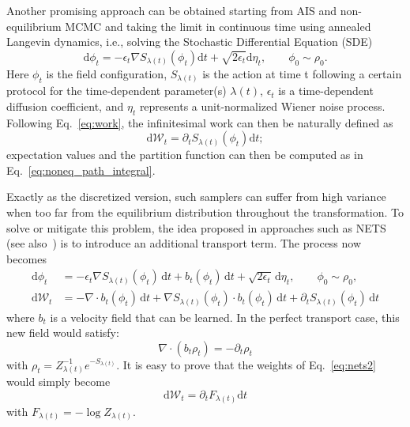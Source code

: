 \documentclass[12pt]{article}
\begin{document}
Another promising approach can be obtained starting from AIS and non-equilibrium MCMC and taking the limit in continuous time using annealed Langevin dynamics, i.e., solving the Stochastic Differential Equation (SDE)
\begin{equation}
\mathrm{d} \phi_t = - \epsilon_t \nabla S_{\lambda(t)}(\phi_t) \mathrm{d}t + \sqrt{2 \epsilon_t} \mathrm{d}\eta_t, \qquad \phi_0 \sim \rho_0.
\end{equation}
Here $\phi_t$ is the field configuration, $S_{\lambda(t)}$ is the action at time t following a certain protocol for the time-dependent parameter(s) $\lambda(t)$, $\epsilon_t$ is a time-dependent diffusion coefficient, and $\eta_t$ represents a unit-normalized Wiener noise process. Following Eq.~\eqref{eq:work}, the infinitesimal work can then be naturally defined as 
\begin{equation}
    \mathrm{d} \mathcal{W}_t = \partial_t S_{\lambda(t)} (\phi_t) \mathrm{d}t;
\end{equation}
expectation values and the partition function can then be computed as in Eq.~\eqref{eq:noneq_path_integral}.

Exactly as the discretized version, such samplers can suffer from high variance when too far from the equilibrium distribution throughout the transformation. To solve or mitigate this problem, the idea proposed in approaches such as NETS~\cite{Albergo:2024trn} (see also~\cite{vargas2024transport,Kapust:2025ida}) is to introduce an additional transport term. The process now becomes
\begin{align}
    \mathrm{d} \phi_t & = - \epsilon_t \nabla S_{\lambda(t)}(\phi_t) \,\mathrm{d}t + b_t(\phi_t) \,\mathrm{d} t + \sqrt{2 \epsilon_t} \,\mathrm{d}\eta_t, \qquad \phi_0 \sim \rho_0, \\
    \label{eq:nets2}
    \mathrm{d} \mathcal{W}_t & = - \nabla \cdot b_t (\phi_t) \,\mathrm{d}t + \nabla S_{\lambda(t)}(\phi_t) \cdot b_t (\phi_t) \,\mathrm{d}t +  \partial_t S_{\lambda(t)} (\phi_t) \,\mathrm{d}t
\end{align}
where $b_t$ is a velocity field that can be learned. In the perfect transport case, this new field would satisfy: 
\begin{equation}
    \nabla \cdot (b_t \rho_t) = -\partial_t \rho_t
\end{equation}
with $\rho_t = Z_{\lambda(t)}^{-1} e^{-S_{\lambda(t)}}$. It is easy to prove that the weights of Eq.~\eqref{eq:nets2} would simply become
\begin{equation}
    \mathrm{d} \mathcal{W}_t = \partial_t F_{\lambda(t)} \mathrm{d}t
\end{equation}
with $F_{\lambda(t)} = - \log Z_{\lambda(t)}$.
\end{document}
